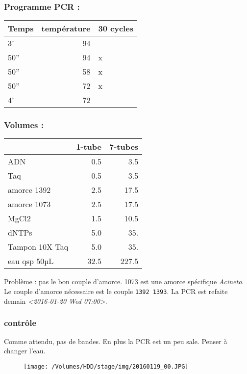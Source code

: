 \documentclass[9pt, oneside, twocolumn]{scrartcl}
\begin{document}
\subsubsection{Programme PCR :}
\label{sec:orgheadline53}
\begin{center}
\begin{tabular}{lrl}
\toprule
Temps & température & 30 cycles\\
\midrule
3' & 94 & \\
50'' & 94 & x\\
50'' & 58 & x\\
50'' & 72 & x\\
4' & 72 & \\
\bottomrule
\end{tabular}
\end{center}
\subsubsection{Volumes :}
\label{sec:orgheadline54}
\begin{center}
\begin{tabular}{lrr}
\toprule
 & 1-tube & 7-tubes\\
\midrule
ADN & 0.5 & 3.5\\
Taq & 0.5 & 3.5\\
amorce 1392 & 2.5 & 17.5\\
amorce 1073 & 2.5 & 17.5\\
MgCl2 & 1.5 & 10.5\\
dNTPs & 5.0 & 35.\\
Tampon 10X Taq & 5.0 & 35.\\
\midrule
eau qsp 50µL & 32.5 & 227.5\\
\bottomrule
\end{tabular}
\end{center}

Problème : pas le bon couple d'amorce. 1073 est une amorce spécifique \emph{Acineto}.
Le couple d'amorce nécessaire est le couple \texttt{1392 1393}. La PCR est refaite
demain \textit{<2016-01-20 Wed 07:00>}.

\subsubsection{contrôle}
\label{sec:orgheadline55}
Comme attendu, pas de bandes. En plus la PCR est un peu sale. Penser à changer
l'eau. 


\begin{figure}[htb]
\centering
\texttt{[image: /Volumes/HDD/stage/img/20160119\_00.JPG]}
\caption{ }
\end{figure}
\end{document}
